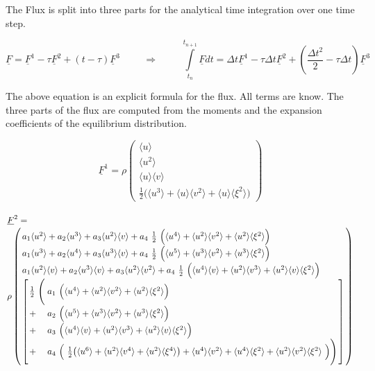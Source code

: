 \documentclass[
	pdftex,             %
	12pt,				%
	a4paper,		   	%
	english,				%
	oneside,			%
]{article}
\newcommand{\mom}[1]{\langle #1 \rangle}
\newcommand{\uu}[1]{\underline{#1}}
\begin{document}
The Flux is split into three parts for the analytical time integration over one time step. 

\begin{equation}
\uu{F} = \uu{F}^1 - \tau \uu{F}^2 + (t - \tau) \uu{F}^3
\hspace{1cm} \Rightarrow \hspace{1cm}
\int \limits_{t_n}^{t_{n+1}} \uu{F} dt 
= \Delta t\uu{F}^1 
- \tau \Delta t \uu{F}^2 
+ \left( \dfrac{\Delta t^2}{2} - \tau \Delta t \right) \uu{F}^3
\end{equation}

The above equation is an explicit formula for the flux. All terms are know. The three parts of the flux are computed from the moments and the expansion coefficients of the equilibrium distribution.

\begin{equation}
\uu{F}^1 =
\rho
\begin{pmatrix}
\mom{u} \\ 
\mom{u^2} \\ 
\mom{u}\mom{v} \\ 
\frac{1}{2} \Big(\mom{u^3} + \mom{u}\mom{v^2} + \mom{u}\mom{\xi^2} \Big)
\end{pmatrix}
\end{equation}


\begin{equation}
\arraycolsep=1.4pt\def\arraystretch{1.5}
\begin{array}{l}
\uu{F}^2 
=
\\
\rho
\left(
\begin{array}{l}
    a_1 \mom{u^2} + 
    a_2 \mom{u^3} +
    a_3 \mom{u^2}\mom{v} +
    a_4 ~\tfrac{1}{2}~\Big( \mom{u^4} + \mom{u^2}\mom{v^2} + \mom{u^2}\mom{\xi^2} \Big)
\\
    a_1 \mom{u^3} +
    a_2 \mom{u^4} +
    a_3 \mom{u^3}\mom{v} +
    a_4 ~\tfrac{1}{2}~\Big( \mom{u^5} + \mom{u^3}\mom{v^2} + \mom{u^3}\mom{\xi^2} \Big)
\\
    a_1 \mom{u^2}\mom{v} +
    a_2 \mom{u^3}\mom{v} +
    a_3 \mom{u^2}\mom{v^2} +
    a_4 ~\tfrac{1}{2}~\Big( \mom{u^4}\mom{v} + \mom{u^2}\mom{v^3} + \mom{u^2}\mom{v}\mom{\xi^2} \Big)
\\
\left[
\begin{array}{ll}
\frac{1}{2} ~ \Bigg( 
   & a_1~ \Big( \mom{u^4} + \mom{u^2}\mom{v^2} + \mom{u^2}\mom{\xi^2} \Big) \\
 + & a_2~ \Big( \mom{u^5} + \mom{u^3}\mom{v^2} + \mom{u^3}\mom{\xi^2} \Big) \\
 + & a_3~ \Big( \mom{u^4}\mom{v} + \mom{u^2}\mom{v^3} + \mom{u^2}\mom{v}\mom{\xi^2} \Big) \\
 + & a_4~ \Big(~ \tfrac{1}{2} \big( \mom{u^6} + \mom{u^2}\mom{v^4} + \mom{u^2}\mom{\xi^4} \big)
 				+ \mom{u^4}\mom{v^2} + \mom{u^4}\mom{\xi^2} + \mom{u^2}\mom{v^2}\mom{\xi^2} ~\Big)
\Bigg)
\end{array}
\right]
\end{array}
\right)
\end{array}
\end{equation}
\end{document}
